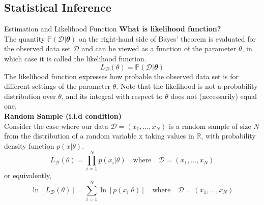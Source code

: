 \documentclass{bredelebeamer}
\begin{document}
\subsection{Statistical Inference}
\begin{frame}{Estimation and Likelihood Function}
  \textbf{What is likelihood function?}\\
  The quantity $\mathbb{P}(\mathcal{D}|\mathbfit{\theta})$ on the right-hand
  side of Bayes’ theorem is evaluated for the observed data set $\mathcal{D}$
  and can be viewed as a function of the parameter $\theta$, in which case it
  is called the likelihood function.
  \begin{equation}
    L_{\mathcal{D}} (\theta) = \mathbb{P} (\mathcal{D}|\mathbfit{\theta})
  \end{equation}
  The likelihood function expresses how probable the observed data set is for
  different settings of the parameter $\theta$. Note that the likelihood is
  not a probability distribution over $\theta$, and its integral with respect
  to $\theta$ does not (necessarily) equal one.\\
  \vspace{\baselineskip}
  \textbf{Random Sample (i.i.d condition)}\\
  Consider the case where our data $\mathcal{D} = (x_1,\ldots,x_N)$
  is a random sample of size $N$ from the distribution of a random variable $\mathrm{x}$
  taking values in $\mathbb{R}$, with probability density function $p(x|\theta)$.
  \begin{equation}
    L_{\mathcal{D}} (\theta) = \prod_{i=1}^{N} p(x_i|\theta)
    \quad \textrm{where} \quad
    \mathcal{D} = (x_1,\ldots,x_N)
  \end{equation}
  or equivalently,
  \begin{equation}
    \ln [L_{\mathcal{D}} (\theta)]
      = \sum_{i=1}^{N} \ln [p(x_i|\theta)]
      \quad \textrm{where} \quad
    \mathcal{D} = (x_1,\ldots,x_N)
  \end{equation}
\end{frame}
\end{document}
